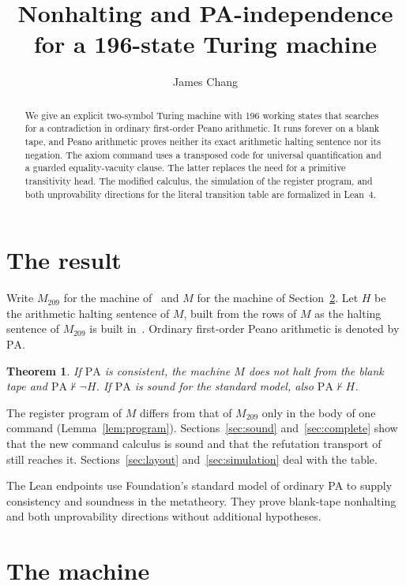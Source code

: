 \documentclass[11pt,letterpaper]{article}
\title{Nonhalting and PA-independence\\for a 196-state Turing machine}
\author{James Chang}
\date{}
\newtheorem{theorem}{Theorem}[section]
\newcommand{\PA}{\mathrm{PA}}
\begin{document}
\maketitle

\begin{abstract}
We give an explicit two-symbol Turing machine with 196 working states
that searches for a contradiction in ordinary first-order Peano
arithmetic. It runs forever on a blank tape, and Peano arithmetic
proves neither its exact arithmetic halting sentence nor its negation.
The axiom command uses a transposed code for universal quantification
and a guarded equality-vacuity clause. The latter replaces the need
for a primitive transitivity head. The modified calculus, the simulation
of the register program, and both unprovability directions for the
literal transition table are formalized in Lean~4.
\end{abstract}

\section{The result}\label{sec:result}

Write $M_{209}$ for the machine of~\cite{pa209} and $M$ for the
machine of Section~\ref{sec:machine}. Let $H$ be the arithmetic halting sentence
of $M$, built from the rows of $M$ as the halting sentence of
$M_{209}$ is built in~\cite[\S5]{pa209}. Ordinary first-order Peano
arithmetic is denoted by $\PA$.

\begin{theorem}\label{thm:main}
If $\PA$ is consistent, the machine $M$ does not halt from the blank
tape and $\PA\nvdash\neg H$. If $\PA$ is sound for the standard model,
also $\PA\nvdash H$.
\end{theorem}

The register program of $M$ differs from that of $M_{209}$ only in the
body of one command (Lemma~\ref{lem:program}). Sections~\ref{sec:sound}
and~\ref{sec:complete} show that the new command calculus is sound and
that the refutation transport of~\cite{pa209} still reaches it.
Sections~\ref{sec:layout} and~\ref{sec:simulation} deal with the table.

The Lean endpoints use Foundation's standard model of ordinary PA to
supply consistency and soundness in the metatheory. They prove blank-tape
nonhalting and both unprovability directions without additional hypotheses.

\section{The machine}\label{sec:machine}
\end{document}
